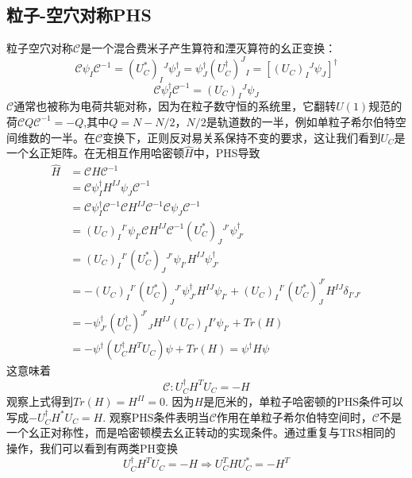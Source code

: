 \documentclass{article}
\numberwithin{equation}{subsection}
\newcommand{\mC}{\mathcal{C}}
\begin{document}
\subsection{粒子-空穴对称PHS}
粒子空穴对称$\mC$是一个混合费米子产生算符和湮灭算符的幺正变换：
\begin{equation}
    \mC\psi_I\mC^{-1}=(U_C^*)_I{}^J\psi_J^\dagger=\psi_J^\dagger(U_C^\dagger)^J{}_I=[(U_C)_I{}^J\psi_J]^\dagger
\end{equation}
\begin{equation}
    \mC\psi_I^\dagger\mC^{-1}=(U_C)_I{}^J\psi_J
\end{equation}
$\mC$通常也被称为电荷共轭对称，因为在粒子数守恒的系统里，它翻转$U(1)$规范的荷$\mC Q\mC^{-1}=-Q$,其中$Q=N-N/2$，$N/2$是轨道数的一半，例如单粒子希尔伯特空间维数的一半。在$\mC$变换下，正则反对易关系保持不变的要求，这让我们看到$U_C$是一个幺正矩阵。在无相互作用哈密顿$\hat{H}$中，PHS导致
\begin{equation}
    \begin{split}
        \hat{H}&=\mC\hat{H}\mC^{-1}\\
        &=\mC\psi_I^\dagger H^{IJ} \psi_J \mC^{-1}\\
        &=\mC\psi_I^\dagger\mC^{-1}\mC H^{IJ}\mC^{-1}\mC\psi_J\mC^{-1}\\
        &=(U_C)_I{}^{I'}\psi_{I'}\mC H^{IJ}\mC^{-1} (U_C^*)_J{}^{J'}\psi_{J'}^\dagger\\
        &=(U_C)_I{}^{I'}(U_C^*)_J{}^{J'}\psi_{I'}H^{IJ}\psi_{J'}^\dagger\\
        &=-(U_C)_I{}^{I'}(U_C^*)_J{}^{J'}\psi_{J'}^\dagger H^{IJ}\psi_{I'}+(U_C)_I{}^{I'}(U_C^*)_J^{J'}H^{IJ}\delta_{I'J'}\\
        &=-\psi_{J'}^\dagger(U_C^\dagger)^{J'}{}_JH^{IJ}(U_C)_I^{}{I'}\psi_{I'}+Tr(H)\\
        &=-\psi^\dagger(U_C^\dagger H^TU_C)\psi+Tr(H)=\psi^\dagger H\psi
    \end{split}
\end{equation}
这意味着
\begin{equation}
    \mC: U_C^\dagger H^T U_C=-H
\end{equation}
观察上式得到$Tr(H)=H^{II}=0$. 因为$H$是厄米的，单粒子哈密顿的PHS条件可以写成$-U_C^\dagger H^*U_C=H$. 观察PHS条件表明当$\mC$作用在单粒子希尔伯特空间时，$\mC$不是一个幺正对称性，而是哈密顿模去幺正转动的实现条件。通过重复与TRS相同的操作，我们可以看到有两类PH变换
\begin{equation}
    U_C^\dagger H^T U_C=-H\Rightarrow U_C^THU_C^*=-H^T
\end{equation}
\end{document}
